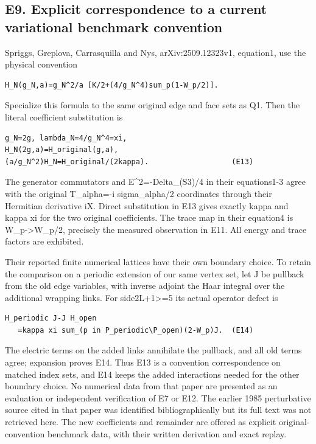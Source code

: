 \documentclass[11pt,a4paper]{article}
\renewcommand{\[}{\begingroup\small\originaldisplaystart}
\renewcommand{\]}{\originaldisplayend\endgroup}
\begin{document}
\subsection{E9. Explicit correspondence to a current variational
benchmark
convention}\label{e9.-explicit-correspondence-to-a-current-variational-benchmark-convention}

Spriggs, Greplova, Carrasquilla and Nys, arXiv:2509.12323v1, equation1,
use the physical convention

\begin{verbatim}
H_N(g_N,a)=g_N^2/a [K/2+(4/g_N^4)sum_p(1-W_p/2)].
\end{verbatim}

Specialize this formula to the same original edge and face sets as Q1.
Then the literal coefficient substitution is

\begin{verbatim}
g_N=2g, lambda_N=4/g_N^4=xi,
H_N(2g,a)=H_original(g,a),
(a/g_N^2)H_N=H_original/(2kappa).                   (E13)
\end{verbatim}

The generator commutators and E\^{}2=-Delta\_(S3)/4 in their
equations1-3 agree with the original T\_alpha=-i sigma\_alpha/2
coordinates through their Hermitian derivative iX. Direct substitution
in E13 gives exactly kappa and kappa xi for the two original
coefficients. The trace map in their equation4 is
W\_p-\textgreater W\_p/2, precisely the measured observation in E11. All
energy and trace factors are exhibited.

Their reported finite numerical lattices have their own boundary choice.
To retain the comparison on a periodic extension of our same vertex set,
let J be pullback from the old edge variables, with inverse adjoint the
Haar integral over the additional wrapping links. For
side2L+1\textgreater=5 its actual operator defect is

\begin{verbatim}
H_periodic J-J H_open
   =kappa xi sum_(p in P_periodic\P_open)(2-W_p)J.  (E14)
\end{verbatim}

The electric terms on the added links annihilate the pullback, and all
old terms agree; expansion proves E14. Thus E13 is a convention
correspondence on matched index sets, and E14 keeps the added
interactions needed for the other boundary choice. No numerical data
from that paper are presented as an evaluation or independent
verification of E7 or E12. The earlier 1985 perturbative source cited in
that paper was identified bibliographically but its full text was not
retrieved here. The new coefficients and remainder are offered as
explicit original-convention benchmark data, with their written
derivation and exact replay.
\end{document}
